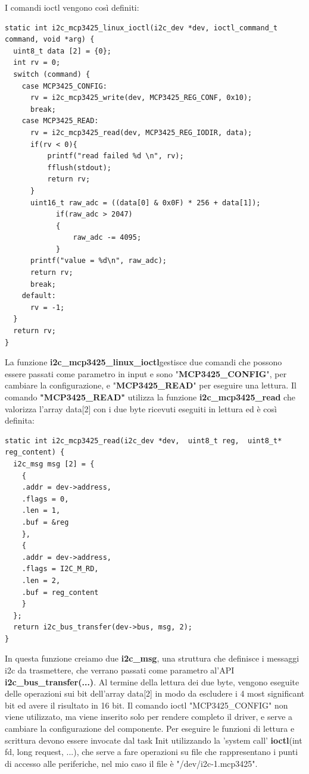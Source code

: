 \documentclass[12pt, a4paper, titlepage, oneside]{book}
\begin{document}
\newpage
I comandi ioctl vengono così definiti: 
\begin{lstlisting}[style = CStyle]
static int i2c_mcp3425_linux_ioctl(i2c_dev *dev, ioctl_command_t command, void *arg) {
  uint8_t data [2] = {0};
  int rv = 0;
  switch (command) {
    case MCP3425_CONFIG:
      rv = i2c_mcp3425_write(dev, MCP3425_REG_CONF, 0x10);
      break;
    case MCP3425_READ:
      rv = i2c_mcp3425_read(dev, MCP3425_REG_IODIR, data);
      if(rv < 0){
    	  printf("read failed %d \n", rv);
    	  fflush(stdout);
    	  return rv;
      }
      uint16_t raw_adc = ((data[0] & 0x0F) * 256 + data[1]);
      		if(raw_adc > 2047)
      		{
      			raw_adc -= 4095;
      		}
      printf("value = %d\n", raw_adc);
      return rv;
      break;
    default:
      rv = -1;
  }
  return rv;
}
\end{lstlisting}
La funzione \textbf{i2c\_mcp3425\_linux\_ioctl}gestisce due comandi che possono essere passati come parametro in input e sono "\textbf{MCP3425\_CONFIG}", per cambiare la configurazione, e "\textbf{MCP3425\_READ}" per eseguire una lettura.\newline
\newpage
Il comando \textbf{"MCP3425\_READ"} utilizza la funzione \textbf{i2c\_mcp3425\_read} che valorizza l'array data[2] con i due byte ricevuti eseguiti in lettura ed è così definita: 
\begin{lstlisting}[style = CStyle]
static int i2c_mcp3425_read(i2c_dev *dev,  uint8_t reg,  uint8_t* reg_content) {
  i2c_msg msg [2] = {
    {
    .addr = dev->address,
    .flags = 0,
    .len = 1,
    .buf = &reg
    },
    {
    .addr = dev->address,
    .flags = I2C_M_RD,
    .len = 2,
    .buf = reg_content
    }
  };
  return i2c_bus_transfer(dev->bus, msg, 2);
}
\end{lstlisting}
In questa funzione creiamo due \textbf{i2c\_msg}, una struttura che definisce i messaggi i2c da trasmettere, che verrano passati come parametro al'API \textbf{i2c\_bus\_transfer(...)}.\newline
Al termine della lettura dei due byte, vengono eseguite delle operazioni sui bit dell'array data[2] in modo da escludere i 4 most significant bit ed avere il risultato in 16 bit.\newline
Il comando ioctl "MCP3425\_CONFIG" non viene utilizzato, ma viene inserito solo per rendere completo il driver, e serve a cambiare la configurazione del componente.\newline
\newpage
Per eseguire le funzioni di lettura e scrittura devono essere invocate dal task Init utilizzando la 'system call' \textbf{ioctl}(int fd, long request, ...), che serve a fare operazioni su file che rappresentano i punti di accesso alle periferiche, nel mio caso il file è "/dev/i2c-1.mcp3425". \newline
\end{document}
